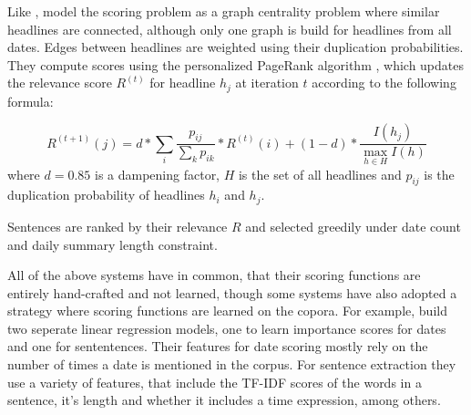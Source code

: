 \documentclass[a4paper,BCOR=10mm]{report}
\numberwithin{lemma}{chapter}
\numberwithin{definition}{chapter}
\begin{document}
Like \citet{yan-trans}, \citet{tran-headlines} model the scoring problem as a graph centrality problem where similar headlines are connected, although only one graph is build for headlines from all dates.
Edges between headlines are weighted using their duplication probabilities.
They compute scores using the personalized PageRank algorithm \citep{topic-sensitive-pagerank}, which updates the relevance score $R^{(t)}$ for headline $h_j$ at iteration $t$ according to the following formula:

\begin{equation}
R^{(t + 1)}(j) = d * \sum_{i} \frac{p_{ij}}{\sum_{k} p_{ik}} * R^{(t)}(i) + (1 - d) * \frac{I(h_j)}{\max_{h \in H} I(h)}
\end{equation}
where $d = 0.85$ is a dampening factor, $H$ is the set of all headlines and $p_{ij}$ is the duplication probability of headlines $h_i$ and $h_j$.

Sentences are ranked by their relevance $R$ and selected greedily under date count and daily summary length constraint.





All of the above systems have in common, that their scoring functions are entirely hand-crafted and not learned, though some systems have also adopted a strategy where scoring functions are learned on the copora.
For example, \citet{tran-relevant} build two seperate linear regression models, one to learn importance scores for dates and one for sententences.
Their features for date scoring mostly rely on the number of times a date is mentioned in the corpus.
For sentence extraction they use a variety of features, that include the TF-IDF scores of the words in a sentence, it's length and whether it includes a time expression, among others.
\end{document}
